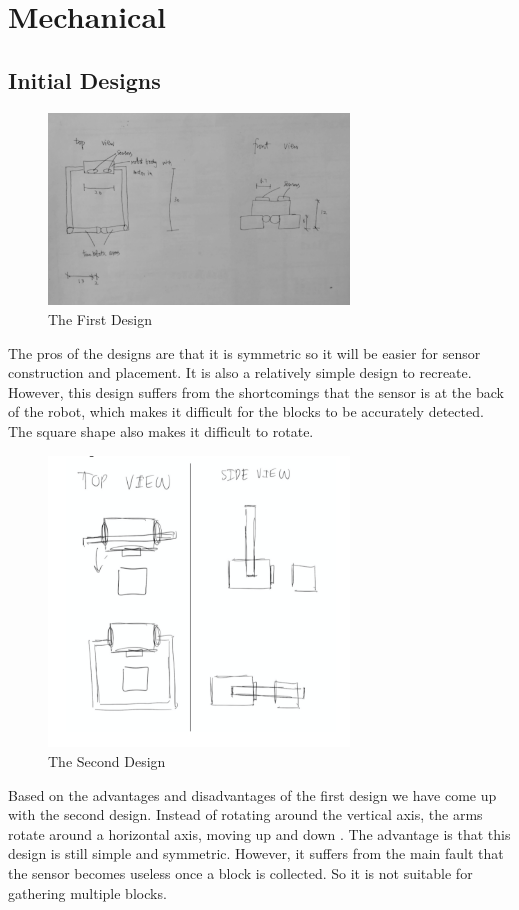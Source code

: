 \section{Mechanical}
\subsection{Initial Designs}

\begin{figure}[H]
    \centering
    \includegraphics[width=8cm]{Design1}
    \caption{The First Design}
\end{figure}


The pros of the designs are that it is symmetric so it will be easier for sensor construction and placement. It is also a relatively simple design to recreate. However, this design suffers from the shortcomings that the sensor is at the back of the robot, which makes it difficult for the blocks to be accurately detected. The square shape also makes it difficult to rotate.


\begin{figure}[H]
    \centering
    \includegraphics[width=8cm]{Design2}
    \caption{The Second Design}
\end{figure}


Based on the advantages and disadvantages of the first design we have come up with the second design. Instead of rotating around the vertical axis, the arms rotate around a horizontal axis, moving up and down . The advantage is that this design is still simple and symmetric. However, it suffers from the main fault that the sensor becomes useless once a block is collected. So it is not suitable for gathering multiple blocks.

